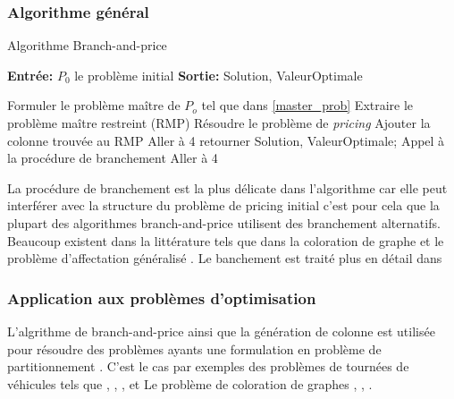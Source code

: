 \documentclass[12pt,a4paper,oneside]{book}
\theoremstyle{definition}
\begin{document}
			
			
			\subsubsection{Algorithme général}
			
			
		\begin{algorithm}[H]
		    \caption{Algorithme Branch-and-price}
    		\SetAlgoLined
    		\DontPrintSemicolon
    		\textbf{Entrée:} $P_0$ le problème initial \;
    		\textbf{Sortie:} Solution, ValeurOptimale \;
    		
    		Formuler le problème maître de $P_o$ tel que dans \ref{master_prob}  \;
    		Extraire le problème maître restreint (RMP)\;
    		Résoudre le problème de \textit{pricing} \;
    		{
    		    Ajouter la colonne trouvée au RMP \;
    		    Aller à 4 \;
    		}
    		{
    		    {
    		        retourner Solution, ValeurOptimale;
    		    }
    		    {
    		        Appel à la procédure de branchement \;
    		        Aller à 4
    		    }
    		}
    		
    	\end{algorithm}
			
		La procédure de branchement est la plus délicate dans l'algorithme car elle peut interférer avec la structure du problème de pricing initial c'est pour cela que la plupart des algorithmes branch-and-price utilisent des branchement alternatifs. Beaucoup existent dans la littérature tels que dans la coloration de graphe \cite{Mehrotra1996} et le problème d'affectation généralisé \cite{Savelsbergh1997}. Le banchement est traité plus en détail dans \cite{vanderbeck2011branching}
		
		
		\subsubsection{Application aux problèmes d'optimisation}
		L'algrithme de branch-and-price ainsi que la génération de colonne est utilisée pour résoudre des problèmes ayants une formulation en problème de partitionnement \cite{archetti2014survey}. C'est le cas par exemples des problèmes de tournées de véhicules tels que \cite{dell2006branch}, \cite{feillet2010tutorial}, \cite{danna2005branch}, \cite{christiansen2007branch} et \cite{salani2011branch}
		Le problème de coloration de graphes \cite{hoshino2011branch}, \cite{Mehrotra1996}, \cite{archetti2014branch}.
			
\end{document}
